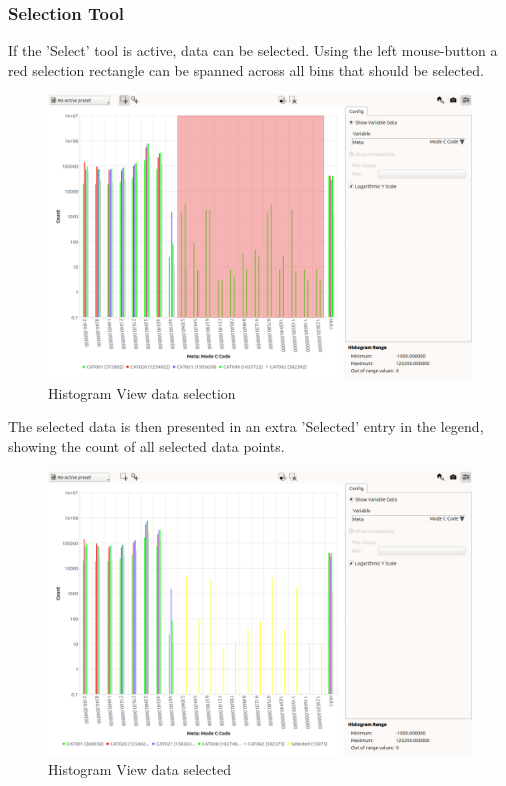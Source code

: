 \subsubsection{Selection Tool}
 
If the 'Select' tool is active, data can be selected. Using the left mouse-button a red selection rectangle can be spanned across all bins that should be selected.

\begin{figure}[H]
    \hspace*{-2cm}
    \includegraphics[width=18cm,frame]{figures/histogram_select.png}
  \caption{Histogram View data selection}
\end{figure}

The selected data is then presented in an extra 'Selected' entry in the legend, showing the count of all selected data points.

\begin{figure}[H]
    \hspace*{-2cm}
    \includegraphics[width=18cm,frame]{figures/histogram_selected.png}
  \caption{Histogram View data selected}
\end{figure}

